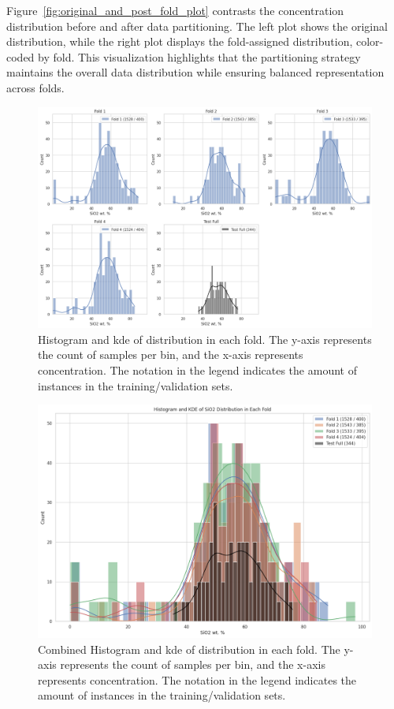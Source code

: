 Figure~\ref{fig:original_and_post_fold_plot} contrasts the  concentration distribution before and after data partitioning.
The left plot shows the original distribution, while the right plot displays the fold-assigned distribution, color-coded by fold.
This visualization highlights that the partitioning strategy maintains the overall data distribution while ensuring balanced representation across folds.

\begin{figure}[h!]
    \centering
    \includegraphics[width=\textwidth]{images/histogram_grid_plot.png}
    \caption{Histogram and \gls{kde} of  distribution in each fold. The y-axis represents the count of samples per bin, and the x-axis represents  concentration. The notation in the legend indicates the amount of instances in the training/validation sets.}
    \label{fig:histogram_grid_plot}
\end{figure}

\begin{figure}[h!]
    \centering
    \includegraphics[width=\textwidth]{images/histogram_kde_plot.png}
    \caption{Combined Histogram and \gls{kde} of  distribution in each fold. The y-axis represents the count of samples per bin, and the x-axis represents  concentration. The notation in the legend indicates the amount of instances in the training/validation sets.}
    \label{fig:histogram_kde_plot}
\end{figure}

